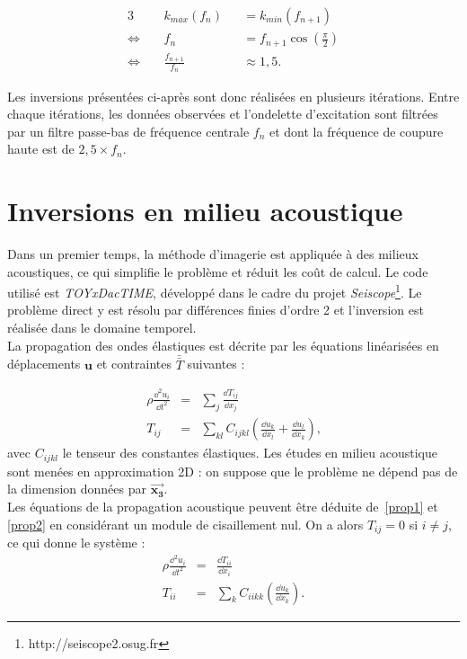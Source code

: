 \begin{alignat*}{3}
	  ~&k_{max}(f_{n}) &&= k_{min}(f_{n+1})\\
	\Leftrightarrow~~~~~ &  f_n &&= f_{n+1}\cos \left(\frac{\pi}{2} \right)\\
	 \Leftrightarrow~~~~~ & \frac{f_{n+1}}{f_n} && \approx  1,5.
\end{alignat*} 

Les inversions présentées ci-après sont donc réalisées en plusieurs itérations. Entre chaque itérations, les données observées et l'ondelette d'excitation sont filtrées par un filtre passe-bas de fréquence centrale $f_{n}$ et dont la fréquence de coupure haute est de $2,5 \times f_{n}$.


\section{Inversions en milieu acoustique}

Dans un premier temps, la méthode d'imagerie est appliquée à des milieux acoustiques, ce qui simplifie le problème et réduit les coût de calcul. Le code utilisé est \emph{TOYxDacTIME}, développé dans le cadre du projet \emph{Seiscope}\footnote{http://seiscope2.osug.fr}. Le problème direct y est résolu par différences finies d'ordre 2 et l'inversion est réalisée dans le domaine temporel.\\

La propagation des ondes élastiques est décrite par les équations linéarisées en déplacements $\bm{u}$ et contraintes $\bar{\bar T}$ suivantes \citep{mat_ac2} : 

\begin{eqnarray}
	\rho \frac{\dd^2 u_{i}}{\dd t^2} &=& \displaystyle\sum_{j}\frac{\dd T_{ij}}{\dd x_{j}}	\label{prop1}\\
	T_{ij}&=&\displaystyle\sum_{kl}C_{ijkl}\left( \frac{\dd u_{k}}{\dd x_{l}} + \frac{\dd u_{l}}{\dd x_{k}}\right)\text{,}	\label{prop2}
\end{eqnarray}
avec $C_{ijkl}$ le tenseur des constantes élastiques. Les études en milieu acoustique sont menées en approximation 2D : on suppose que le problème ne dépend pas de la dimension données par $\bm{\overrightarrow{x_3}}$.\\

Les équations de la propagation acoustique peuvent être déduite de~\ref{prop1} et \ref{prop2} en considérant un module de cisaillement nul. On a alors $T_{ij}=0$ si $i\neq j$, ce qui donne le système :
\begin{eqnarray}
	\rho \frac{\dd^2 u_{i}}{\dd t^2} &=& \frac{\dd T_{ii}}{\dd x_{i}}\\
	T_{ii} &=& \displaystyle\sum_{k}C_{iikk}\left( \frac{\dd u_{k}}{\dd x_{k}}\right)	.
\end{eqnarray}


